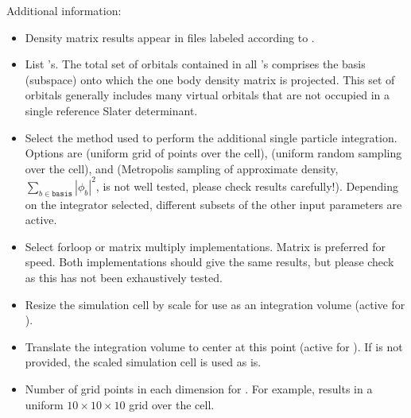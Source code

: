 \documentclass[letterpaper,10pt,english]{sphinxmanual}
\begin{document}
Additional information:
\begin{itemize}
\item {} 
 Density matrix results appear in  files labeled
according to .

\item {} 
 List ’s. The total set of orbitals
contained in all ’s comprises the basis (subspace) onto
which the one body density matrix is projected. This set of orbitals
generally includes many virtual orbitals that are not occupied in a
single reference Slater determinant.

\item {} 
 Select the method used to perform the additional
single particle integration. Options are  (uniform
grid of points over the cell),  (uniform random sampling
over the cell), and  (Metropolis sampling of approximate
density, \(\sum_{b\in \texttt{basis}}\left|{\phi_b}\right|^2\), is not
well tested, please check results carefully!). Depending on the
integrator selected, different subsets of the other input parameters
are active.

\item {} 
 Select for\sphinxhyphen{}loop or matrix multiply implementations.
Matrix is preferred for speed. Both implementations should give the
same results, but please check as this has not been exhaustively
tested.

\item {} 
 Resize the simulation cell by scale for use as an
integration volume (active for ).

\item {} 
 Translate the integration volume to center at this point
(active for ). If  is
not provided, the scaled simulation cell is used as is.

\item {} 
 Number of grid points in each dimension for
. For example,  results in a
uniform \(10 \times 10 \times 10\) grid over the cell.


\end{itemize}
\end{document}

